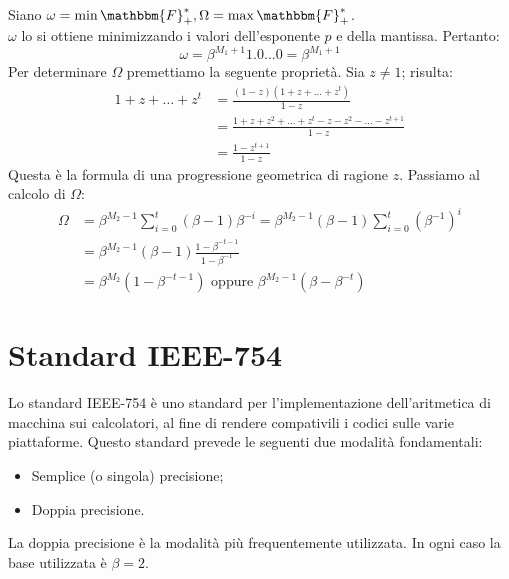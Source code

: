 \documentclass[12pt]{report}
\begin{document}
\begin{enumerate}
		Siano $\omega = \min{\mathbbm{F}_+^*}, \Omega = \max{\mathbbm{F}_+^*}$. \\
		$\omega$ lo si ottiene minimizzando i valori dell'esponente $p$ e della mantissa. Pertanto:
		\[
		\omega = \beta^{M_1 + 1}1.0\dots0 = \beta^{M_1 + 1}
		\]
		Per determinare $\Omega$ premettiamo la seguente proprietà. Sia $z \neq 1$; risulta:
		\begin{align*}
		1 + z + \dots + z^t &= \frac{(1-z)(1+z+\dots+z^t)}{1-z} \\
		&= \frac{1 + z + z^2 + \dots + z^t  - z -z^2 - \dots - z^{t + 1}}{1-z} \\
		&= \frac{1 - z^{t+1}}{1-z}
		\end{align*}
		Questa è la formula di una progressione geometrica di ragione $z$. Passiamo al calcolo di $\Omega$:
		\begin{align*}
			\Omega &= \beta^{M_2 - 1}\sum_{i=0}^{t}(\beta -1)\beta^{-i} = \beta^{M_2 - 1}(\beta - 1)\sum_{i=0}^{t}(\beta^{-1})^i \\
			&= \beta^{M_2 - 1}(\beta - 1)\frac{1 - \beta^{-t - 1}}{1 - \beta^{-1}} \\
			&= \beta^{M_2}(1 - \beta^{-t - 1}) \text{ oppure } \beta^{M_2 - 1}(\beta - \beta^{-t})
		\end{align*}
	\end{enumerate}
\section{Standard IEEE-754}
Lo standard IEEE-754 è uno standard per l'implementazione dell'aritmetica di macchina sui calcolatori, al fine di rendere compativili i codici sulle varie piattaforme. Questo standard prevede le seguenti due modalità fondamentali:
\begin{itemize}
	\item Semplice (o singola) precisione;
	\item Doppia precisione.
\end{itemize}
La doppia precisione è la modalità più frequentemente utilizzata. In ogni caso la base utilizzata è $\beta = 2$.
\end{document}
